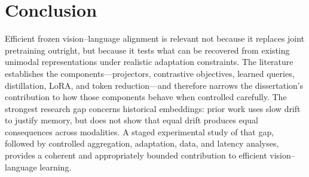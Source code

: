 \section{Conclusion}

Efficient frozen vision--language alignment is relevant not because it replaces
joint pretraining outright, but because it tests what can be recovered from
existing unimodal representations under realistic adaptation constraints. The
literature establishes the components---projectors, contrastive objectives,
learned queries, distillation, LoRA, and token reduction---and therefore narrows
the dissertation's contribution to how those components behave when controlled
carefully. The strongest research gap concerns historical embeddings: prior work
uses slow drift to justify memory, but does not show that equal drift produces
equal consequences across modalities. A staged experimental study of that gap,
followed by controlled aggregation, adaptation, data, and latency analyses,
provides a coherent and appropriately bounded contribution to efficient
vision--language learning.

